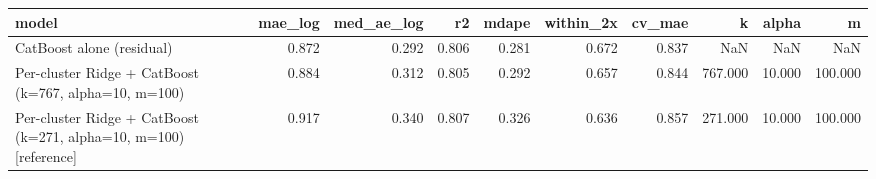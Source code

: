 \begin{tabular}{lrrrrrrrrr}
\toprule
model & mae_log & med_ae_log & r2 & mdape & within_2x & cv_mae & k & alpha & m \\
\midrule
CatBoost alone (residual) & 0.872 & 0.292 & 0.806 & 0.281 & 0.672 & 0.837 & NaN & NaN & NaN \\
Per-cluster Ridge + CatBoost (k=767, alpha=10, m=100) & 0.884 & 0.312 & 0.805 & 0.292 & 0.657 & 0.844 & 767.000 & 10.000 & 100.000 \\
Per-cluster Ridge + CatBoost (k=271, alpha=10, m=100) [reference] & 0.917 & 0.340 & 0.807 & 0.326 & 0.636 & 0.857 & 271.000 & 10.000 & 100.000 \\
\bottomrule
\end{tabular}
